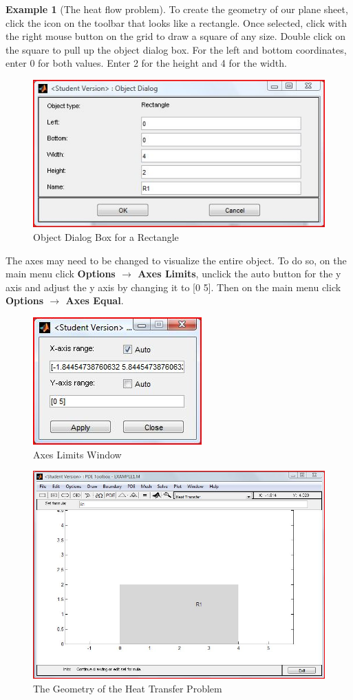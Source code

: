 \documentclass{amsart}
\theoremstyle{definition}
\newtheorem{example}{Example}
\begin{document}
\begin{example}[The heat flow problem]
To create the geometry of our plane sheet, click the icon on the toolbar that looks like a rectangle. Once selected, click with the right mouse button on the grid to draw a square of any size. Double click on the square to pull up the object dialog box. For the left and bottom coordinates, enter 0 for both values. Enter 2 for the height and 4 for the width. 

\begin{figure}[ht]
   \includegraphics[height = 1.2 in]{ObjectDialogBoxRectangle}
   \caption{Object Dialog Box for a Rectangle}
\end{figure}

\pagebreak

The axes may need to be changed to visualize the entire object. To do so, on the main menu click  \textbf{Options $\to$ Axes Limits}, unclick the auto button for the y axis and adjust the y axis by changing it to [0 5]. Then on the main menu click \textbf{Options $\to$ Axes Equal}.

\begin{figure}[ht]
   \includegraphics[height = 1.2 in]{AxesLimitsWindow}
   \caption{Axes Limits Window}
\end{figure}

\begin{figure}[ht]
   \includegraphics[height = 3 in]{DrawModeExample1}
   \caption{The Geometry of the Heat Transfer Problem}
\end{figure}
\pagebreak


\end{example}
\end{document}
